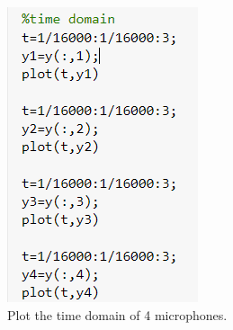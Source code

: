 \documentclass{report}
\begin{document}
\includegraphics[scale=0.7]{code time domain}
\\Plot the time domain of 4 microphones.
\begin{figure}


\end{figure}
\end{document}
